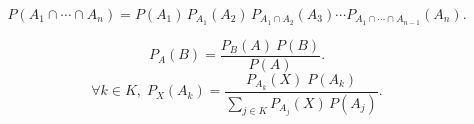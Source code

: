 \begin{recap-box}[frametitle={Probabilités composées}]
	\[P(A_1 \cap \cdots \cap A_n) = P(A_1)\,P_{A_1}(A_2)\,P_{A_1\cap A_2}(A_3)\cdots P_{A_1\cap\cdots\cap A_{n-1}}(A_n).\]
\end{recap-box}

\begin{recap-box}[frametitle={Bayes}]
	\[
		P_A(B) = \frac{P_B(A)\:P(B)}{P(A)}
	.\]
	\[
		\forall k \in K,\;P_X(A_k) = \frac{P_{A_k}(X)\;P(A_k)}{\sum_{j \in K}P_{A_j}(X)\,P(A_j)}
	.\]
\end{recap-box}
